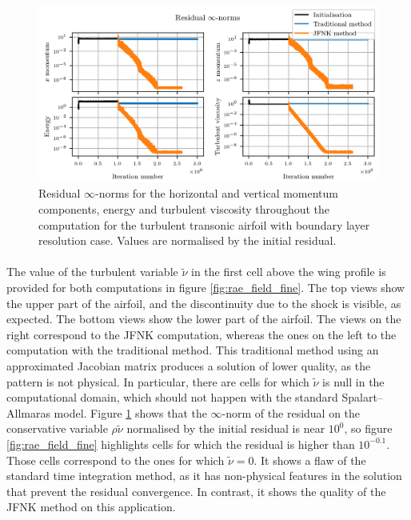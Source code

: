         \begin{figure}
          \centering
          \includegraphics{figures/rae_residuals_fine_linf.png}
          \caption{Residual $\infty$-norms for the horizontal and vertical momentum components, energy and turbulent viscosity throughout the computation for the turbulent transonic airfoil with boundary layer resolution case.
          Values are normalised by the initial residual.}
          \label{fig:rae_residuals_fine_linf}
        \end{figure}

        \paragraph{}
        The value of the turbulent variable $\tilde{\nu}$ in the first cell above the wing profile is provided for both computations in figure \ref{fig:rae_field_fine}.
        The top views show the upper part of the airfoil, and the discontinuity due to the shock is visible, as expected.
        The bottom views show the lower part of the airfoil.
        The views on the right correspond to the JFNK computation, whereas the ones on the left to the computation with the traditional method.
        This traditional method using an approximated Jacobian matrix produces a solution of lower quality, as the pattern is not physical.
        In particular, there are cells for which $\tilde{\nu}$ is null in the computational domain, which should not happen with the standard Spalart--Allmaras model.
        Figure \ref{fig:rae_residuals_fine_linf} shows that the $\infty$-norm of the residual on the conservative variable $\rho \tilde{\nu}$ normalised by the initial residual is near $10^0$, so figure \ref{fig:rae_field_fine} highlights cells for which the residual is higher than $10^{-0.1}$.
        Those cells correspond to the ones for which $\tilde{\nu} = 0$.
        It shows a flaw of the standard time integration method, as it has non-physical features in the solution that prevent the residual convergence.
        In contrast, it shows the quality of the JFNK method on this application.

